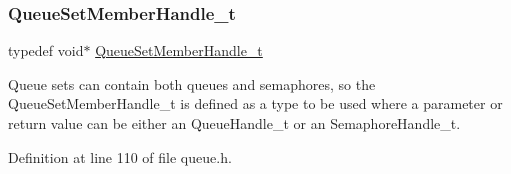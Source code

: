 \mbox{\label{group___queue_management_ga6c19a940d8fe07d338928ecea68b1776}} 
\subsubsection{\texorpdfstring{Queue\+Set\+Member\+Handle\+\_\+t}{QueueSetMemberHandle\_t}}
{\footnotesize\ttfamily typedef void$\ast$ \hyperlink{group___queue_management_ga6c19a940d8fe07d338928ecea68b1776}{Queue\+Set\+Member\+Handle\+\_\+t}}

Queue sets can contain both queues and semaphores, so the Queue\+Set\+Member\+Handle\+\_\+t is defined as a type to be used where a parameter or return value can be either an Queue\+Handle\+\_\+t or an Semaphore\+Handle\+\_\+t. 

Definition at line 110 of file queue.\+h.

